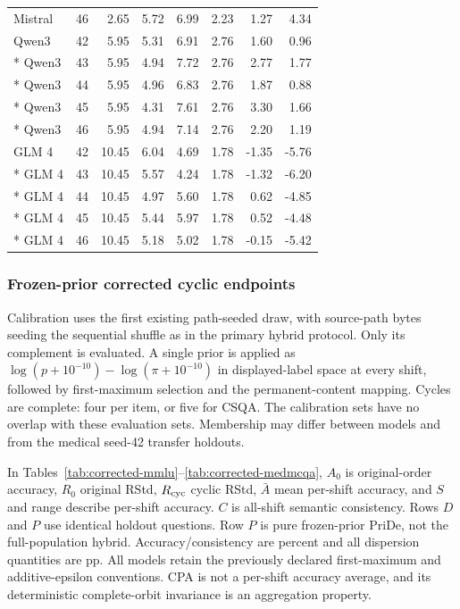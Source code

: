 {\begin{longtable}{lrrrrrrr}
Mistral & 46 & 2.65 & 5.72 & 6.99 & 2.23 & 1.27 & 4.34\\
Qwen3 & 42 & 5.95 & 5.31 & 6.91 & 2.76 & 1.60 & 0.96\\*
Qwen3 & 43 & 5.95 & 4.94 & 7.72 & 2.76 & 2.77 & 1.77\\*
Qwen3 & 44 & 5.95 & 4.96 & 6.83 & 2.76 & 1.87 & 0.88\\*
Qwen3 & 45 & 5.95 & 4.31 & 7.61 & 2.76 & 3.30 & 1.66\\*
Qwen3 & 46 & 5.95 & 4.94 & 7.14 & 2.76 & 2.20 & 1.19\\
GLM 4 & 42 & 10.45 & 6.04 & 4.69 & 1.78 & -1.35 & -5.76\\*
GLM 4 & 43 & 10.45 & 5.57 & 4.24 & 1.78 & -1.32 & -6.20\\*
GLM 4 & 44 & 10.45 & 4.97 & 5.60 & 1.78 & 0.62 & -4.85\\*
GLM 4 & 45 & 10.45 & 5.44 & 5.97 & 1.78 & 0.52 & -4.48\\*
GLM 4 & 46 & 10.45 & 5.18 & 5.02 & 1.78 & -0.15 & -5.42\\
\end{longtable}}


\FloatBarrier\subsubsection{Frozen-prior corrected cyclic endpoints}\label{app:robustness-permutation}

Calibration uses the first existing path-seeded draw, with source-path bytes seeding the sequential shuffle as in the primary hybrid protocol. Only its complement is evaluated. A single prior is applied as $\log(p+10^{-10})-\log(\pi+10^{-10})$ in displayed-label space at every shift, followed by first-maximum selection and the permanent-content mapping. Cycles are complete: four per item, or five for CSQA. The calibration sets have no overlap with these evaluation sets. Membership may differ between models and from the medical seed-42 transfer holdouts.

In Tables~\ref{tab:corrected-mmlu}--\ref{tab:corrected-medmcqa}, $A_0$ is original-order accuracy, $R_0$ original RStd, $R_{\rm cyc}$ cyclic RStd, $\bar A$ mean per-shift accuracy, and $S$ and range describe per-shift accuracy. $C$ is all-shift semantic consistency. Rows $D$ and $P$ use identical holdout questions. Row $P$ is pure frozen-prior PriDe, not the full-population hybrid. Accuracy/consistency are percent and all dispersion quantities are pp. All models retain the previously declared first-maximum and additive-epsilon conventions. CPA is not a per-shift accuracy average, and its deterministic complete-orbit invariance is an aggregation property.

